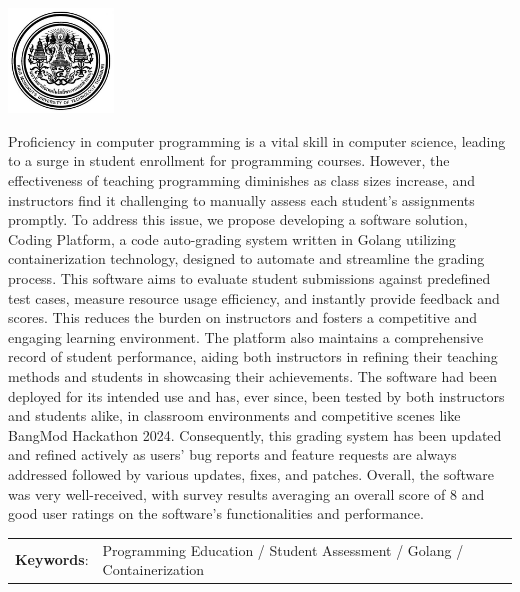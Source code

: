 \documentclass[12pt,one side,openright,a4paper]{cpe-thesis-th}
\begin{document}
\pdfstringdefDisableCommands{
\let\MakeUppercase\relax
}

\begin{center}
  \includegraphics[width=2.8cm]{./figure/logo02.jpg}
\end{center}
\vspace*{-1cm}

\maketitlepage
\makesignaturepage 

\abstract
Proficiency in computer programming is a vital skill in computer science, leading to a surge in student enrollment for programming courses. However, the effectiveness of teaching programming diminishes as class sizes increase, and instructors find it challenging to manually assess each student's assignments promptly. To address this issue, we propose developing a software solution, Coding Platform, a code auto-grading system written in Golang utilizing containerization technology, designed to automate and streamline the grading process. This software aims to evaluate student submissions against predefined test cases, measure resource usage efficiency, and instantly provide feedback and scores. This reduces the burden on instructors and fosters a competitive and engaging learning environment. The platform also maintains a comprehensive record of student performance, aiding both instructors in refining their teaching methods and students in showcasing their achievements. The software had been deployed for its intended use and has, ever since, been tested by both instructors and students alike, in classroom environments and competitive scenes like BangMod Hackathon 2024. Consequently, this grading system has been updated and refined actively as users' bug reports and feature requests are always addressed followed by various updates, fixes, and patches. Overall, the software was very well-received, with survey results averaging an overall score of 8 and good user ratings on the software's functionalities and performance.

\justifying
\begin{tabular*}{\textwidth}{@{}lp{}}
\textbf{Keywords}: & Programming Education / Student Assessment / Golang / Containerization 
\end{tabular*}
\vspace{1mm}
\endabstract
\end{document}
